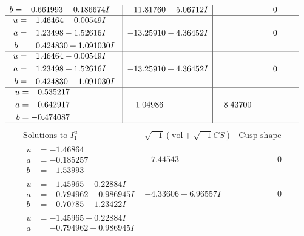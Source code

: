 \documentclass[1p]{elsarticle_modified}
\theoremstyle{definition}
\newcommand{\I}{\sqrt{-1}}
\begin{document}
$$\begin{array}{c|c|c}
\begin{aligned}
b &= -0.661993 - 0.186674 I\end{aligned}
 & -11.81760 - 5.06712 I & \phantom{-0.000000 } 0 \\ \hline\begin{aligned}
u &= \phantom{-}1.46464 + 0.00549 I \\
a &= \phantom{-}1.23498 - 1.52616 I \\
b &= \phantom{-}0.424830 + 1.091030 I\end{aligned}
 & -13.25910 - 4.36452 I & \phantom{-0.000000 } 0 \\ \hline\begin{aligned}
u &= \phantom{-}1.46464 - 0.00549 I \\
a &= \phantom{-}1.23498 + 1.52616 I \\
b &= \phantom{-}0.424830 - 1.091030 I\end{aligned}
 & -13.25910 + 4.36452 I & \phantom{-0.000000 } 0 \\ \hline\begin{aligned}
u &= \phantom{-}0.535217\phantom{ +0.000000I} \\
a &= \phantom{-}0.642917\phantom{ +0.000000I} \\
b &= -0.474087\phantom{ +0.000000I}\end{aligned}
 & -1.04986\phantom{ +0.000000I} & -8.43700\phantom{ +0.000000I}\\
 \hline 
 \end{array}$$\newpage$$\begin{array}{c|c|c}  
\text{Solutions to }I^u_{1}& \I (\text{vol} + \sqrt{-1}CS) & \text{Cusp shape}\\
 \hline 
\begin{aligned}
u &= -1.46864\phantom{ +0.000000I} \\
a &= -0.185257\phantom{ +0.000000I} \\
b &= -1.53993\phantom{ +0.000000I}\end{aligned}
 & -7.44543\phantom{ +0.000000I} & \phantom{-0.000000 } 0 \\ \hline\begin{aligned}
u &= -1.45965 + 0.22884 I \\
a &= -0.794962 - 0.986945 I \\
b &= -0.70785 + 1.23422 I\end{aligned}
 & -4.33606 + 6.96557 I & \phantom{-0.000000 } 0 \\ \hline\begin{aligned}
u &= -1.45965 - 0.22884 I \\
a &= -0.794962 + 0.986945 I \\

\end{aligned}
\end{array}$$
\end{document}
